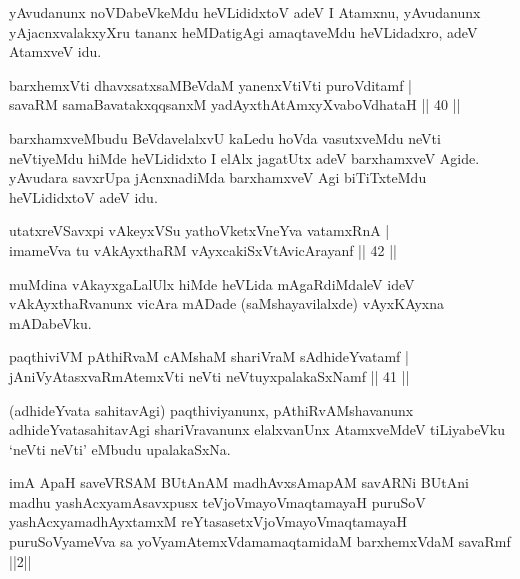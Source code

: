 \begin{artha}
yAvudanunx noVDabeVkeMdu heVLididxtoV adeV I Atamxnu, yAvudanunx yAjacnxvalakxyXru tananx heMDatigAgi amaqtaveMdu heVLidadxro, adeV AtamxveV idu.
\end{artha}


\begin{shl}
barxhemxVti dhavxsatxsaMBeVdaM yanenxVtiVti puroVditamf |\\
savaRM samaBavatakxqqsanxM yadAyxthAtAmxyXvaboVdhataH \hfill || 40 ||
\end{shl}

\begin{artha}
barxhamxveMbudu BeVdavelalxvU kaLedu hoVda vasutxveMdu neVti neVtiyeMdu hiMde heVLididxto I elAlx jagatUtx adeV barxhamxveV Agide. yAvudara savxrUpa jAcnxnadiMda barxhamxveV Agi biTiTxteMdu heVLididxtoV adeV idu.
\end{artha}

\begin{shl}
utatxreVSavxpi vAkeyxVSu yathoVketxVneYva vatamxRnA |\\
imameVva tu vAkAyxthaRM vAyxcakiSxVtAvicArayanf \hfill || 42 ||
\end{shl}

\begin{artha}
muMdina vAkayxgaLalUlx hiMde heVLida mAgaRdiMdaleV ideV vAkAyxthaRvanunx vicAra mADade (saMshayavilalxde) vAyxKAyxna mADabeVku.
\end{artha}

\begin{shl}
paqthiviVM pAthiRvaM cAMshaM shariVraM sAdhideYvatamf |\\
jAniVyAtasxvaRmAtemxVti neVti neVtuyxpalakaSxNamf \hfill || 41 ||
\end{shl}

\begin{artha}
(adhideYvata sahitavAgi) paqthiviyanunx, pAthiRvAMshavanunx adhideYvatasahitavAgi shariVravanunx elalxvanUnx AtamxveMdeV   tiLiyabeVku `neVti neVti' eMbudu upalakaSxNa.
\end{artha}


\begin{kandikeshl}
imA ApaH saveVRSAM BUtAnAM madhAvxsAmapAM savARNi BUtAni madhu yashAcxyamAsavxpusx teVjoVmayoV\s maqtamayaH puruSoV yashAcxyamadhAyxtamxM reYtasasetxVjoVmayoV\s maqtamayaH puruSoV\s\break yameVva sa yoV\s yamAtemxVdamamaqtamidaM barxhemxVdaM savaRmf ||2||
\end{kandikeshl}

